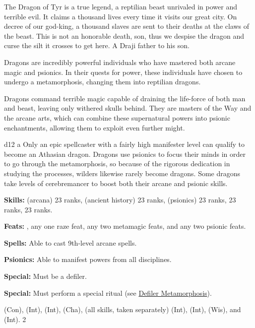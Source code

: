 {The Dragon of Tyr is a true legend, a reptilian beast unrivaled in power and terrible evil. It claims a thousand lives every time it visits our great city. On decree of our god-king, a thousand slaves are sent to their deaths at the claws of the beast. This is not an honorable death, son, thus we despise the dragon and curse the silt it crosses to get here.}
{A Draji father to his son.}
{
Dragons are incredibly powerful individuals who have mastered both arcane magic and psionics. In their quests for power, these individuals have chosen to undergo a metamorphosis, changing them into reptilian dragons.

Dragons command terrible magic capable of draining the life-force of both man and beast, leaving only withered skulls behind. They are masters of the Way and the arcane arts, which can combine these supernatural powers into psionic enchantments, allowing them to exploit even further might.
}
{d12}
{a}
{
Only an epic spellcaster with a fairly high manifester level can qualify to become an Athasian dragon. Dragons use psionics to focus their minds in order to go through the metamorphosis, so because of the rigorous dedication in studying the processes, wilders likewise rarely become dragons. Some dragons take levels of cerebremancer to boost both their arcane and psionic skills.
}
{
\textbf{Skills:}  (arcana) 23 ranks,  (ancient history) 23 ranks,  (psionics) 23 ranks,  23 ranks,  23 ranks.

\textbf{Feats:} , any one raze feat, any two metamagic feats, and any two psionic feats.

\textbf{Spells:} Able to cast 9th-level arcane spells.

\textbf{Psionics:} Able to manifest powers from all disciplines.

\textbf{Special:} Must be a defiler.

\textbf{Special:} Must perform a special ritual (see \hyperref[Defiler Metamorphosis]{Defiler Metamorphosis}).
}
{
 (Con),  (Int),  (Int),  (Cha),  (all skills, taken separately) (Int),  (Int),  (Wis), and  (Int).
}
{2}
{\WarriorTable[ll *{3}{Z{12mm}} L]}
